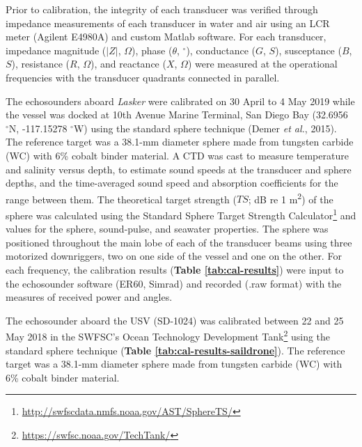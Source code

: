 \documentclass[]{article}
\let\rmarkdownfootnote\footnote%
\def\footnote{\protect\rmarkdownfootnote}
\begin{document}
Prior to calibration, the integrity of each transducer was verified through impedance measurements of each transducer in water and air using an LCR meter (Agilent E4980A) and custom Matlab software. For each transducer, impedance magnitude (\(|Z|\), \(\Omega\)), phase (\(\theta\), \(^\circ\)), conductance (\(G\), \(S\)), susceptance (\(B\), \(S\)), resistance (\(R\), \(\Omega\)), and reactance (\(X\), \(\Omega\)) were measured at the operational frequencies with the transducer quadrants connected in parallel.

The echosounders aboard \emph{Lasker} were calibrated on 30 April to 4 May 2019 while the vessel was docked at 10th Avenue Marine Terminal, San Diego Bay (32.6956 \(^{\circ}\textrm{N}\), -117.15278 \(^{\circ}\textrm{W}\)) using the standard sphere technique (Demer \emph{et al.}, 2015). The reference target was a 38.1-mm diameter sphere made from tungsten carbide (WC) with 6\% cobalt binder material. A CTD was cast to measure temperature and salinity versus depth, to estimate sound speeds at the transducer and sphere depths, and the time-averaged sound speed and absorption coefficients for the range between them. The theoretical target strength (\(TS\); dB re 1 m\textsuperscript{2}) of the sphere was calculated using the Standard Sphere Target Strength Calculator\footnote{\url{http://swfscdata.nmfs.noaa.gov/AST/SphereTS/}} and values for the sphere, sound-pulse, and seawater properties. The sphere was positioned throughout the main lobe of each of the transducer beams using three motorized downriggers, two on one side of the vessel and one on the other. For each frequency, the calibration results (\textbf{Table \ref{tab:cal-results}}) were input to the echosounder software (ER60, Simrad) and recorded (.raw format) with the measures of received power and angles.

The echosounder aboard the USV (SD-1024) was calibrated between 22 and 25 May 2018 in the SWFSC's Ocean Technology Development Tank\footnote{\url{https://swfsc.noaa.gov/TechTank/}} using the standard sphere technique (\textbf{Table \ref{tab:cal-results-saildrone}}). The reference target was a 38.1-mm diameter sphere made from tungsten carbide (WC) with 6\% cobalt binder material.
\end{document}
